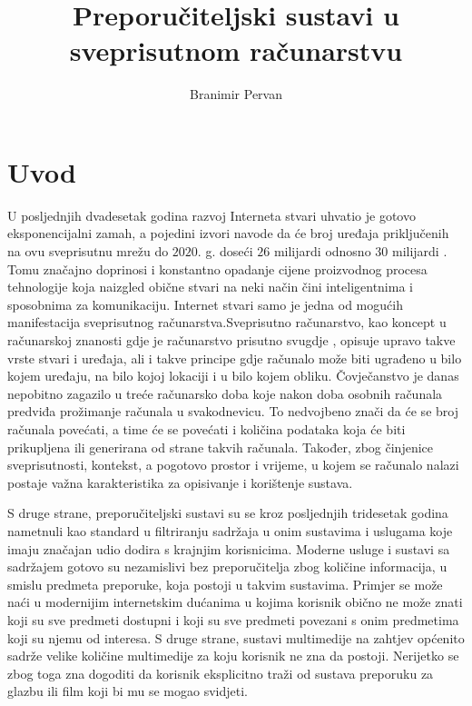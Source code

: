 \documentclass[times, utf8, diplomski, numeric]{fer}
\begin{document}
\title{Preporučiteljski sustavi u sveprisutnom računarstvu}
\author{Branimir Pervan}
\maketitle

\izvornik


\tableofcontents

\chapter{Uvod}
U posljednjih dvadesetak godina razvoj Interneta stvari  uhvatio je gotovo eksponencijalni zamah, a pojedini izvori navode da
će broj uređaja priključenih na ovu sveprisutnu mrežu do $2020$. g. doseći $26$
milijardi \cite{gartner2013Iot} odnosno $30$ milijardi \cite{ABI2013Iot}. Tomu
značajno doprinosi i konstantno opadanje cijene proizvodnog procesa tehnologije
koja naizgled obične stvari na neki način čini inteligentnima i sposobnima za
komunikaciju. Internet stvari samo je jedna od mogućih manifestacija
sveprisutnog računarstva.Sveprisutno računarstvo, kao koncept u računarskoj
znanosti gdje je računarstvo prisutno svugdje \cite{theComputerWeiser}, opisuje
upravo takve vrste stvari i uređaja, ali i takve principe gdje računalo može
biti ugrađeno u bilo kojem uređaju, na bilo kojoj lokaciji i u bilo kojem
obliku. Čovječanstvo je danas nepobitno zagazilo u treće računarsko doba koje
nakon doba osobnih računala predviđa prožimanje računala u svakodnevicu. To
nedvojbeno znači da će se broj računala povećati, a time će se povećati i
količina podataka koja će biti prikupljena ili generirana od strane takvih
računala. Također, zbog činjenice sveprisutnosti, kontekst, a pogotovo prostor i
vrijeme, u kojem se računalo nalazi postaje važna karakteristika za opisivanje i
korištenje sustava.

S druge strane, preporučiteljski sustavi su se kroz posljednjih tridesetak
godina nametnuli kao standard u filtriranju sadržaja u onim sustavima i uslugama
koje imaju značajan udio dodira s krajnjim korisnicima. Moderne usluge i sustavi
sa sadržajem gotovo su nezamislivi bez preporučitelja zbog količine informacija,
u smislu predmeta preporuke, koja postoji u takvim sustavima. Primjer se može
naći u modernijim internetskim dućanima u kojima korisnik obično ne može znati
koji su sve predmeti dostupni i koji su sve predmeti povezani s onim predmetima
koji su njemu od interesa. S druge strane, sustavi multimedije na zahtjev
 općenito sadrže velike količine multimedije za koju
korisnik ne zna da postoji. Nerijetko se zbog toga zna dogoditi da korisnik
eksplicitno traži od sustava preporuku za glazbu ili film koji bi mu se mogao
svidjeti.
\end{document}
